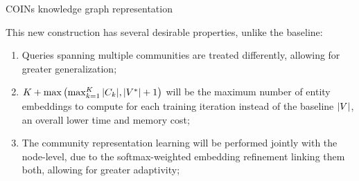 \begin{algorithm}%
\caption{COINs knowledge graph representation}
\label{algorithm:coins}
\begin{algorithmic}[1]
\ELSE
{}
\ENDIF
{}
\end{algorithmic}
\end{algorithm} 
This new construction has several desirable properties, unlike the baseline: 
\begin{enumerate}
    \item Queries spanning multiple communities are treated differently, allowing for greater generalization; 
    \item $K + \max{\mathopen{}\left(\max_{k=1}^{K}{\mathopen{}\left|C_k\right|},\mathopen{}\left|V^{*}\right| + 1\right)}$ will be the maximum number of entity embeddings to compute for each training iteration instead of the baseline $\mathopen{}\left|V\right|$, an overall lower time and memory cost;
    \item The community representation learning will be performed jointly with the node-level, due to the softmax-weighted embedding refinement linking them both, allowing for greater adaptivity;
\end{enumerate}

